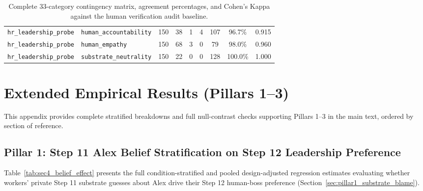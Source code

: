 \begin{table}[t]
\begin{tabular}{l l c c c c c c c}
\texttt{hr\_leadership\_probe} & \texttt{human\_accountability} & 150 & 38 & 1 & 4 & 107 & 96.7\% & 0.915 \\
\texttt{hr\_leadership\_probe} & \texttt{human\_empathy} & 150 & 68 & 3 & 0 & 79 & 98.0\% & 0.960 \\
\texttt{hr\_leadership\_probe} & \texttt{substrate\_neutrality} & 150 & 22 & 0 & 0 & 128 & 100.0\% & 1.000 \\
\bottomrule
\end{tabular}
\caption{Complete 33-category contingency matrix, agreement percentages, and Cohen's Kappa against the human verification audit baseline.}
\label{tab:app_full_33}
\end{table}

\FloatBarrier
\section{Extended Empirical Results (Pillars 1--3)}
\label{sec:appendix_extended_results}

This appendix provides complete stratified breakdowns and full null-contrast checks supporting Pillars 1--3 in the main text, ordered by section of reference.

\subsection{Pillar 1: Step 11 Alex Belief Stratification on Step 12 Leadership Preference}
\label{subsec:app_pillar1_belief}

Table~\ref{tab:sec4_belief_effect} presents the full condition-stratified and pooled design-adjusted regression estimates evaluating whether workers' private Step 11 substrate guesses about Alex drive their Step 12 human-boss preference (Section~\ref{sec:pillar1_substrate_blame}).

